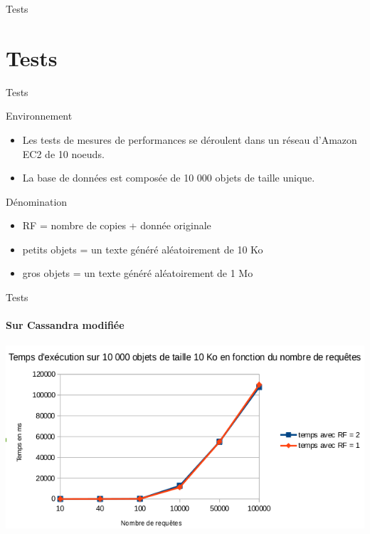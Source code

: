 \documentclass{beamer}
\begin{document}
\begin{frame}{Tests}
 
\end{frame}

\section{Tests}

\begin{frame}{Tests}

\begin{block}{Environnement}
    \begin{itemize}
        \item Les tests de mesures de performances se déroulent dans un réseau d'Amazon EC2 de 10 noeuds.
        \item La base de données est composée de 10 000 objets de taille unique.
    \end{itemize}
\end{block}
\begin{block}{Dénomination}
    \begin{itemize}
        \item RF = nombre de copies + donnée originale
        \item petits objets = un texte généré aléatoirement de 10 Ko
        \item gros objets = un texte généré aléatoirement de 1 Mo
    \end{itemize}
\end{block}
\end{frame}

\begin{frame}{Tests}
\framesubtitle{Sur Cassandra modifiée}
\centering
    \includegraphics[scale=0.6]{PAF-RF-PO}
\end{frame}
\end{document}

